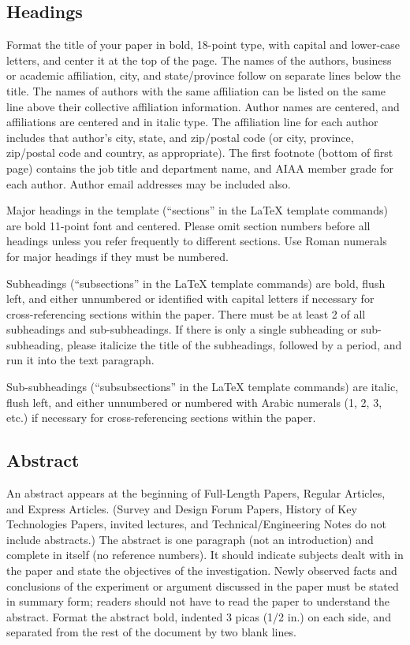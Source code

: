 \documentclass[journal]{new-aiaa}
\begin{document}
\subsection{Headings}
Format the title of your paper in bold, 18-point type, with capital and lower-case letters, and center it at the top of the page. The names of the authors, business or academic affiliation, city, and state/province follow on separate lines below the title. The names of authors with the same affiliation can be listed on the same line above their collective affiliation information. Author names are centered, and affiliations are centered and in italic type. The affiliation line for each author includes that author’s city, state, and zip/postal code (or city, province, zip/postal code and country, as appropriate). The first footnote (bottom of first page) contains the job title and department name, and AIAA member grade for each author. Author email addresses may be included also.

Major headings in the template (``sections'' in the \LaTeX{} template commands) are bold 11-point font and centered. Please omit section numbers before all headings unless you refer frequently to different sections. Use Roman numerals for major headings if they must be numbered.

Subheadings (``subsections'' in the \LaTeX{} template commands) are bold, flush left, and either unnumbered or identified with capital letters if necessary for cross-referencing sections within the paper. There must be at least 2 of all subheadings and sub-subheadings. If there is only a single subheading or sub-subheading, please italicize the title of the subheadings, followed by a period, and run it into the text paragraph. 

Sub-subheadings (``subsubsections'' in the \LaTeX{} template commands) are italic, flush left, and either unnumbered or numbered with Arabic numerals (1, 2, 3, etc.) if necessary for cross-referencing sections within the paper.


\subsection{Abstract}
An abstract appears at the beginning of Full-Length Papers, Regular Articles, and Express Articles. (Survey and Design Forum Papers, History of Key Technologies Papers, invited lectures, and Technical/Engineering Notes do not include abstracts.) The abstract is one paragraph (not an introduction) and complete in itself (no reference numbers). It should indicate subjects dealt with in the paper and state the objectives of the investigation. Newly observed facts and conclusions of the experiment or argument discussed in the paper must be stated in summary form; readers should not have to read the paper to understand the abstract. Format the abstract bold, indented 3 picas (1/2 in.) on each side, and separated from the rest of the document by two blank lines.
\end{document}
